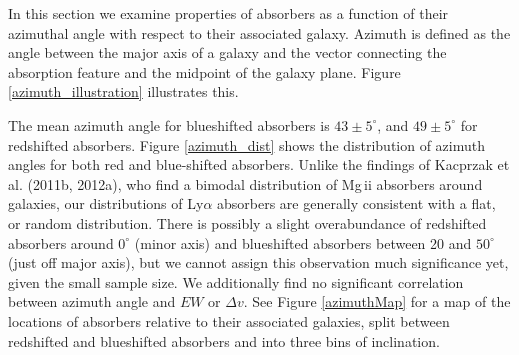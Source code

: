 In this section we examine properties of absorbers as a function of their azimuthal angle with respect to their associated galaxy. Azimuth is defined as the angle between the major axis of a galaxy and the vector connecting the absorption feature and the midpoint of the galaxy plane. Figure \ref{azimuth_illustration} illustrates this. 

The mean azimuth angle for blueshifted absorbers is $43\pm5^{\circ}$, and $49\pm5^{\circ}$ for redshifted absorbers. Figure \ref{azimuth_dist} shows the distribution of azimuth angles for both red and blue-shifted absorbers. Unlike the findings of Kacprzak et al. (2011b, 2012a), who find a bimodal distribution of Mg\,{\sc ii} absorbers around galaxies, our distributions of Ly$\alpha$ absorbers are generally consistent with a flat, or random distribution. There is possibly a slight overabundance of redshifted absorbers around $0^{\circ}$ (minor axis) and blueshifted absorbers between 20 and $50^{\circ}$ (just off major axis), but we cannot assign this observation much significance yet, given the small sample size. We additionally find no significant correlation between azimuth angle and $EW$ or $\Delta v$. See Figure \ref{azimuthMap} for a map of the locations of absorbers relative to their associated galaxies, split between redshifted and blueshifted absorbers and into three bins of inclination.

